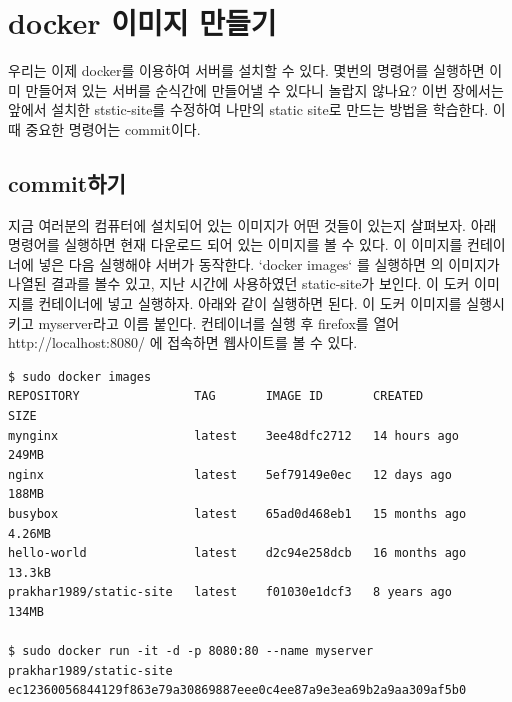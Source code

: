 \chapter{docker 이미지 만들기}
우리는 이제 docker를 이용하여 서버를 설치할 수 있다. 몇번의 명령어를 실행하면 이미 만들어져 있는 서버를 순식간에 만들어낼 수 있다니 놀랍지 않나요? 이번 장에서는 앞에서 설치한 ststic-site를 수정하여 나만의 static site로 만드는 방법을 학습한다. 이 때 중요한 명령어는 commit이다. 

\section{commit하기}
지금 여러분의 컴퓨터에 설치되어 있는 이미지가 어떤 것들이 있는지 살펴보자. 
아래 명령어를 실행하면 현재 다운로드 되어 있는 이미지를 볼 수 있다. 이 이미지를 컨테이너에 넣은 다음 실행해야 서버가 동작한다. `docker images` 를 실행하면 의 이미지가 나열된 결과를 볼수 있고, 지난 시간에 사용하였던 static-site가 보인다. 이 도커 이미지를 컨테이너에 넣고 실행하자. 아래와 같이 실행하면 된다. 이 도커 이미지를 실행시키고 myserver라고 이름 붙인다. 컨테이너를 실행 후 firefox를 열어 http://localhost:8080/ 에 접속하면 웹사이트를 볼 수 있다. 


\begin{lstlisting}[language=Shell]
$ sudo docker images 
REPOSITORY                TAG       IMAGE ID       CREATED         SIZE
mynginx                   latest    3ee48dfc2712   14 hours ago    249MB
nginx                     latest    5ef79149e0ec   12 days ago     188MB
busybox                   latest    65ad0d468eb1   15 months ago   4.26MB
hello-world               latest    d2c94e258dcb   16 months ago   13.3kB
prakhar1989/static-site   latest    f01030e1dcf3   8 years ago     134MB

$ sudo docker run -it -d -p 8080:80 --name myserver prakhar1989/static-site
ec12360056844129f863e79a30869887eee0c4ee87a9e3ea69b2a9aa309af5b0
\end{lstlisting}


